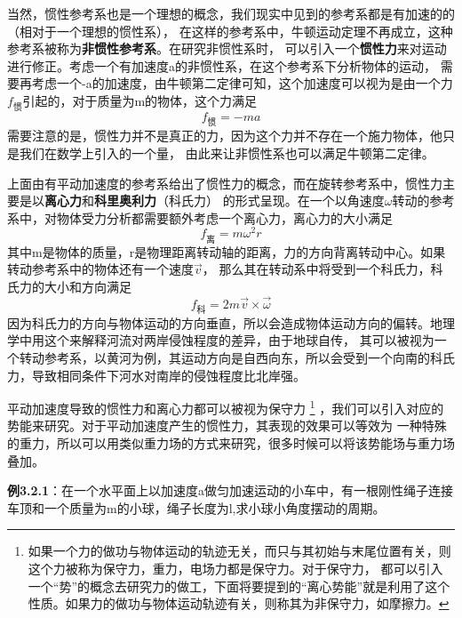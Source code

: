 \documentclass{article}
\begin{document}
    当然，惯性参考系也是一个理想的概念，我们现实中见到的参考系都是有加速的的（相对于一个理想的惯性系），
    在这样的参考系中，牛顿运动定理不再成立，这种参考系被称为\textbf{非惯性参考系}。在研究非惯性系时，
    可以引入一个\textbf{惯性力}来对运动进行修正。考虑一个有加速度a的非惯性系，在这个参考系下分析物体的运动，
    需要再考虑一个-a的加速度，由牛顿第二定律可知，这个加速度可以视为是由一个力\(f_{\text{惯}}\)引起的，对于质量为m的物体，这个力满足
    \begin{equation*}
        f_{\text{惯}} = -ma
    \end{equation*}
    需要注意的是，惯性力并不是真正的力，因为这个力并不存在一个施力物体，他只是我们在数学上引入的一个量，
    由此来让非惯性系也可以满足牛顿第二定律。

    上面由有平动加速度的参考系给出了惯性力的概念，而在旋转参考系中，惯性力主要是以\textbf{离心力}和\textbf{科里奥利力}（科氏力）
    的形式呈现。在一个以角速度\(\omega\)转动的参考系中，对物体受力分析都需要额外考虑一个离心力，离心力的大小满足
    \begin{equation*}
        f_{\text{离}} = m \omega^2 r
    \end{equation*}
    其中m是物体的质量，r是物理距离转动轴的距离，力的方向背离转动中心。如果转动参考系中的物体还有一个速度\(\vec{v}\)，
    那么其在转动系中将受到一个科氏力，科氏力的大小和方向满足
    \begin{equation*}
        f_{\text{科}} = 2m\vec{v} \times \vec{\omega}
    \end{equation*}
    因为科氏力的方向与物体运动的方向垂直，所以会造成物体运动方向的偏转。地理学中用这个来解释河流对两岸侵蚀程度的差异，由于地球自传，
    其可以被视为一个转动参考系，以黄河为例，其运动方向是自西向东，所以会受到一个向南的科氏力，导致相同条件下河水对南岸的侵蚀程度比北岸强。

    平动加速度导致的惯性力和离心力都可以被视为保守力
    \footnote{如果一个力的做功与物体运动的轨迹无关，而只与其初始与末尾位置有关，则这个力被称为保守力，重力，电场力都是保守力。对于保守力，
    都可以引入一个“势”的概念去研究力的做工，下面将要提到的“离心势能”就是利用了这个性质。如果力的做功与物体运动轨迹有关，则称其为非保守力，如摩擦力。}
    ，我们可以引入对应的势能来研究。对于平动加速度产生的惯性力，其表现的效果可以等效为
    一种特殊的重力，所以可以用类似重力场的方式来研究，很多时候可以将该势能场与重力场叠加。

    \textbf{例3.2.1}：在一个水平面上以加速度a做匀加速运动的小车中，有一根刚性绳子连接车顶和一个质量为m的小球，绳子长度为l,求小球小角度摆动的周期。
\end{document}
